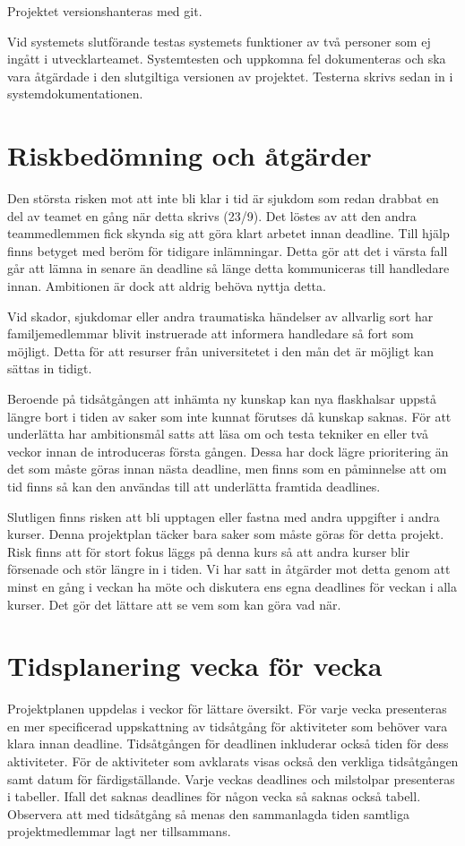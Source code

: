 \documentclass{TDP003mall}
\begin{document}
Projektet versionshanteras med git.

Vid systemets slutförande testas systemets funktioner av två personer som ej ingått i utvecklarteamet.
Systemtesten och uppkomna fel dokumenteras och ska vara åtgärdade i den slutgiltiga versionen av projektet.
Testerna skrivs sedan in i systemdokumentationen.

\section{Riskbedömning och åtgärder}
Den största risken mot att inte bli klar i tid är sjukdom som redan drabbat en del av teamet en gång när detta skrivs (23/9). Det löstes av att den andra teammedlemmen fick skynda sig att göra klart arbetet innan deadline. Till hjälp finns betyget med beröm för tidigare inlämningar. Detta gör att det i värsta fall går att lämna in senare än deadline så länge detta kommuniceras till handledare innan. Ambitionen är dock att aldrig behöva nyttja detta.

Vid skador, sjukdomar eller andra traumatiska händelser av allvarlig sort har familjemedlemmar blivit instruerade att informera handledare så fort som möjligt. Detta för att resurser från universitetet i den mån det är möjligt kan sättas in tidigt.

Beroende på tidsåtgången att inhämta ny kunskap kan nya flaskhalsar uppstå längre bort i tiden av saker som inte kunnat förutses då kunskap saknas. För att underlätta har ambitionsmål satts att läsa om och testa tekniker en eller två veckor innan de introduceras första gången. Dessa har dock lägre prioritering än det som måste göras innan nästa deadline, men finns som en påminnelse att om tid finns så kan den användas till att underlätta framtida deadlines.

Slutligen finns risken att bli upptagen eller fastna med andra uppgifter i andra kurser. Denna projektplan täcker bara saker som måste göras för detta projekt. Risk finns att för stort fokus läggs på denna kurs så att andra kurser blir försenade och stör längre in i tiden. Vi har satt in åtgärder mot detta genom att minst en gång i veckan ha möte och diskutera ens egna deadlines för veckan i alla kurser. Det gör det lättare att se vem som kan göra vad när.

\section{Tidsplanering vecka för vecka}
Projektplanen uppdelas i veckor för lättare översikt. För varje vecka presenteras
 en mer specificerad uppskattning av tidsåtgång för aktiviteter som behöver vara
 klara innan deadline. Tidsåtgången för deadlinen inkluderar också tiden för dess
 aktiviteter. För de aktiviteter som avklarats visas också den verkliga tidsåtgången
 samt datum för färdigställande. Varje veckas deadlines och milstolpar presenteras
 i tabeller. Ifall det saknas deadlines för någon vecka så saknas också tabell. Observera att med tidsåtgång så menas den sammanlagda tiden samtliga projektmedlemmar lagt ner tillsammans.
\end{document}
